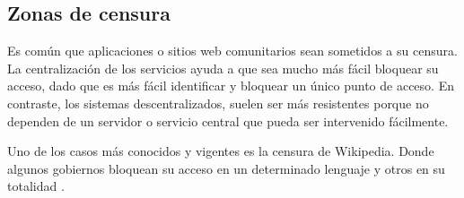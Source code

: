 \subsection{Zonas de censura}
Es común que aplicaciones o sitios web comunitarios sean sometidos a su censura. La centralización de los servicios ayuda a que sea mucho más fácil bloquear su acceso, dado que es más fácil identificar y bloquear un único punto de acceso. En contraste, los sistemas descentralizados, suelen ser más resistentes porque no dependen de un servidor o servicio central que pueda ser intervenido fácilmente.

Uno de los casos más conocidos y vigentes es la censura de Wikipedia. Donde algunos gobiernos bloquean su acceso en un determinado lenguaje y otros en su totalidad \parencite{censorship-wikipedia}.
